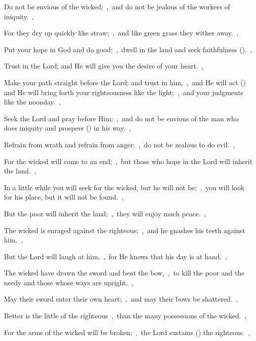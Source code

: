 \documentclass[12pt,twoside,a5paper]{article}
\begin{document}

\begin{normalparskip}
  Do not be envious of the wicked;~\sep\ and do not be jealous of the workers of iniquity.~\sep


  For they dry up quickly like straw;~\sep\ and like green grass they wither away.~\sep

  Put your hope in God and do good;~\sep\ dwell in the land and seek faithfulness ().~\sep

  Trust in the Lord; and He will give you the desire of your heart.~\sep

  Make your path straight before the Lord; and trust in him,~\sep\ and He will act () and He will bring forth your righteousness like the light;~\sep\ and your judgments like the noonday.~\sep

  Seek the Lord and pray before Him;~\sep\ and do not be envious of the man who does iniquity and prospers () in his way.~\sep

  Refrain from wrath and refrain from anger;~\sep\ do not be zealous to do evil.~\sep

  For the wicked will come to an end;~\sep\ but those who hope in the Lord will inherit the land.~\sep

  In a little while you will seek for the wicked, but he will not be;~\sep\ you will look for his place, but it will not be found.~\sep

  But the poor will inherit the land;~\sep\ they will enjoy much peace.~\sep

  The wicked is enraged against the righteous;~\sep\ and he gnashes his teeth against him.~\sep

  But the Lord will laugh at him,~\sep\ for He knows that his day is at hand.~\sep

  The wicked have drawn the sword and bent the bow,~\sep\ to kill the poor and the needy and those whose ways are upright.~\sep

  May their sword enter their own heart;~\sep\ and may their bows be shattered.~\sep

  Better is the little of the righteous~\sep\ than the many possessions of the wicked.~\sep

  For the arms of the wicked will be broken;~\sep\ the Lord sustains () the righteous.~\sep


\end{normalparskip}
\end{document}
